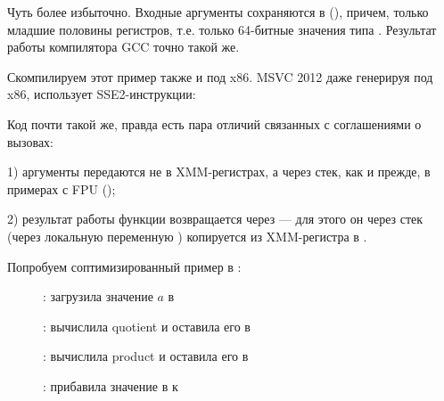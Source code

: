 

Чуть более избыточно. 
Входные аргументы сохраняются в  (), 
причем, только младшие половины регистров, т.е. только 64-битные значения типа \Tdouble{}.
Результат работы компилятора GCC точно такой же.


Скомпилируем этот пример также и под x86. MSVC 2012 даже генерируя под x86, использует SSE2-инструкции:





Код почти такой же, правда есть пара отличий связанных с соглашениями о вызовах:

1) аргументы передаются не в XMM-регистрах, а через стек, как и прежде, в примерах с FPU ();

2) результат работы функции возвращается через  --- для этого он через стек
(через локальную переменную ) копируется из XMM-регистра в .

\clearpage
Попробуем соптимизированный пример в \olly:

\begin{figure}[H]
\centering
{}
\caption{\olly:  загрузила значение $a$ в }
\label{fig:FPU_SIMD_simple_olly1}
\end{figure}

\clearpage
\begin{figure}[H]
\centering
{}
\caption{\olly:  вычислила \gls{quotient} 
и оставила его в }
\label{fig:FPU_SIMD_simple_olly2}
\end{figure}

\clearpage
\begin{figure}[H]
\centering
{}
\caption{\olly:  вычислила \gls{product} и оставила его в }
\label{fig:FPU_SIMD_simple_olly3}
\end{figure}

\clearpage
\begin{figure}[H]
\centering
{}
\caption{\olly:  прибавила значение в  к }
\label{fig:FPU_SIMD_simple_olly4}
\end{figure}

